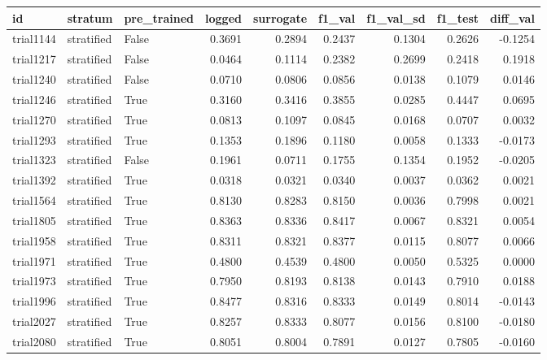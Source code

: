\begin{tabular}{lllrrrrrr}
\toprule
       id &    stratum &  pre\_trained &  logged &  surrogate &  f1\_val &  f1\_val\_sd &  f1\_test &  diff\_val \\
\midrule
trial1144 & stratified &        False &  0.3691 &     0.2894 &  0.2437 &     0.1304 &   0.2626 &   -0.1254 \\
trial1217 & stratified &        False &  0.0464 &     0.1114 &  0.2382 &     0.2699 &   0.2418 &    0.1918 \\
trial1240 & stratified &        False &  0.0710 &     0.0806 &  0.0856 &     0.0138 &   0.1079 &    0.0146 \\
trial1246 & stratified &         True &  0.3160 &     0.3416 &  0.3855 &     0.0285 &   0.4447 &    0.0695 \\
trial1270 & stratified &         True &  0.0813 &     0.1097 &  0.0845 &     0.0168 &   0.0707 &    0.0032 \\
trial1293 & stratified &         True &  0.1353 &     0.1896 &  0.1180 &     0.0058 &   0.1333 &   -0.0173 \\
trial1323 & stratified &        False &  0.1961 &     0.0711 &  0.1755 &     0.1354 &   0.1952 &   -0.0205 \\
trial1392 & stratified &         True &  0.0318 &     0.0321 &  0.0340 &     0.0037 &   0.0362 &    0.0021 \\
trial1564 & stratified &         True &  0.8130 &     0.8283 &  0.8150 &     0.0036 &   0.7998 &    0.0021 \\
trial1805 & stratified &         True &  0.8363 &     0.8336 &  0.8417 &     0.0067 &   0.8321 &    0.0054 \\
trial1958 & stratified &         True &  0.8311 &     0.8321 &  0.8377 &     0.0115 &   0.8077 &    0.0066 \\
trial1971 & stratified &         True &  0.4800 &     0.4539 &  0.4800 &     0.0050 &   0.5325 &    0.0000 \\
trial1973 & stratified &         True &  0.7950 &     0.8193 &  0.8138 &     0.0143 &   0.7910 &    0.0188 \\
trial1996 & stratified &         True &  0.8477 &     0.8316 &  0.8333 &     0.0149 &   0.8014 &   -0.0143 \\
trial2027 & stratified &         True &  0.8257 &     0.8333 &  0.8077 &     0.0156 &   0.8100 &   -0.0180 \\
trial2080 & stratified &         True &  0.8051 &     0.8004 &  0.7891 &     0.0127 &   0.7805 &   -0.0160 \\

\end{tabular}
